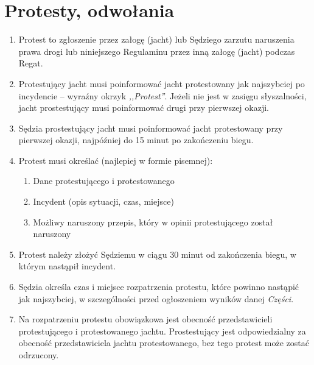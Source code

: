\documentclass[12pt,a4paper]{article}
\begin{document}
\section{Protesty, odwołania}
\begin{enumerate}
    \item Protest to zgłoszenie przez załogę (jacht) lub Sędziego zarzutu naruszenia prawa drogi lub niniejszego Regulaminu przez inną załogę (jacht) podczas Regat.
    \item Protestujący jacht musi poinformować jacht protestowany jak najszybciej po incydencie -- wyraźny okrzyk \textit{,,Protest''}.
    Jeżeli nie jest w zasięgu słyszalności, jacht prostestujący musi poinformować drugi przy pierwszej okazji.
    \item Sędzia prostestujący jacht musi poinformować jacht protestowany przy pierwszej okazji, najpóźniej do 15 minut po zakończeniu biegu.
    \item Protest musi określać (najlepiej w formie pisemnej):
    \begin{enumerate}
        \item Dane protestującego i protestowanego
        \item Incydent (opis sytuacji, czas, miejsce)
        \item Możliwy naruszony przepis, który w opinii protestującego został naruszony
    \end{enumerate}
    \item Protest należy złożyć Sędziemu w ciągu 30 minut od zakończenia biegu, w którym nastąpił incydent.
    \item Sędzia określa czas i miejsce rozpatrzenia protestu, które powinno nastąpić jak najszybciej, w szczególności przed ogłoszeniem wyników danej \textit{Części}.
    \item Na rozpatrzeniu protestu obowiązkowa jest obecność przedstawicieli protestującego i protestowanego jachtu.
    Prostestujący jest odpowiedzialny za obecność przedstawiciela jachtu protestowanego, bez tego protest może zostać odrzucony.
\end{enumerate}
\end{document}
